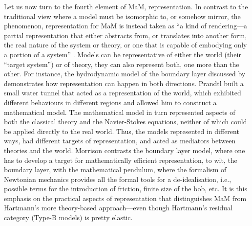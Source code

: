 Let us now turn to the fourth element of MaM, representation.
In contrast to the traditional view where a model must be isomorphic to, or somehow mirror, the phenomenon, representation for MaM is instead taken as ``a kind of rendering---a partial representation that either abstracts from, or translates into another form, the real nature of the system or theory, or one that is capable of embodying only a portion of a system'' \citep[p.~27]{morganmorrison}.
Models can be representative of either the world (their ``target system'') or of theory, they can also represent both, one more than the other. 
For instance, the hydrodynamic model of the boundary layer discussed by \citep{morrison99} demonstrates how representation can happen in both directions.
Prandtl built a small water tunnel that acted as a representation of the world, which exhibited different behaviours in different regions and allowed him to construct a mathematical model.
The mathematical model in turn represented aspects of both the classical theory and the Navier-Stokes equations, neither of which could be applied directly to the real world. 
Thus, the models represented in different ways, had different targets of representation, and acted as mediators between theories and the world. 
Morrison contrasts the boundary layer model, where one has to develop a target for mathematically efficient representation, to wit, the boundary layer, with the mathematical pendulum, where the formalism of Newtonian mechanics provides all the formal tools for a de-idealisation, i.e., possible terms for the introduction of friction, finite size of the bob, etc. 
It is this emphasis on the practical aspects of representation that distinguishes MaM from Hartmann's more theory-based approach---even though Hartmann's residual category (Type-B models) is pretty elastic.

